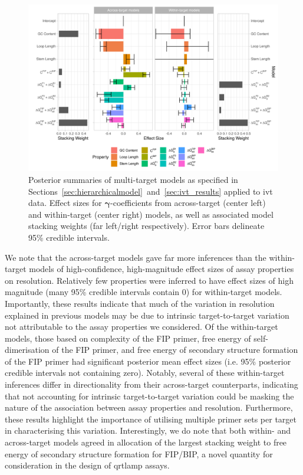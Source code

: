 \documentclass[../thesis.tex]{subfiles}
\begin{document}
\begin{figure}[!tpb] 
\centering
\includegraphics[width=6in]{../figures/chapter2/paper_ivt_eval_fig.png}
\caption{Posterior summaries of multi-target models as specified in Sections~\ref{sec:hierarchicalmodel}~and~\ref{sec:ivt_results} applied to \gls{ivt}  data. Effect sizes for $\bm{\gamma}$-coefficients from across-target (center left) and within-target (center right) models, as well as associated model stacking weights (far left/right respectively). Error bars delineate 95\% credible intervals. \label{fig:ivt_eval}}
\end{figure}

We note that the across-target models gave far more inferences than the within-target models of high-confidence, high-magnitude effect sizes of assay properties on resolution. Relatively few properties were inferred to have effect sizes of high magnitude (many 95\% credible intervals contain 0) for within-target models. Importantly, these results indicate that much of the variation in resolution explained in previous models may be due to intrinsic target-to-target variation not attributable to the assay properties we considered. Of the within-target models, those based on complexity of the FIP primer, free energy of self-dimerisation of the FIP primer, and free energy of secondary structure formation of the FIP primer had significant posterior mean effect sizes (i.e. 95\% posterior credible intervals not containing zero). Notably, several of these within-target inferences differ in directionality from their across-target counterparts, indicating that not accounting for intrinsic target-to-target variation could be masking the nature of the association between assay properties and resolution. Furthermore, these results highlight the importance of utilising multiple primer sets per target in characterising this variation. Interestingly, we do note that both within- and across-target models agreed in allocation of the largest stacking weight to free energy of secondary structure formation for FIP/BIP, a novel quantity for consideration in the design of \gls{qrtlamp} assays.
\end{document}
